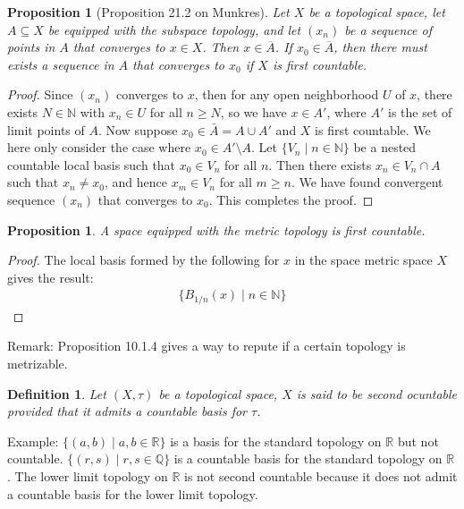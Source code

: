 \documentclass[11pt]{book}
\theoremstyle{break}
\theoremstyle{break}
\newtheorem{prop}[lem]{Proposition}
\newtheorem{defn}{Definition}[corL]
\newcommand{\R}{\mathbb{R}}
\newcommand{\N}{\mathbb{N}}
\newcommand{\Q}{\mathbb{Q}}
\newcommand{\remark}{\color{blue}Remark: \color{black}}
\newcommand{\example}{\color{green}Example: \color{black}}
\begin{document}
\begin{prop}[Proposition 21.2 on Munkres]
Let $X$ be a topological space, let $A \subseteq X$ be equipped with the subspace topology, and let $(x_n)$ be a sequence of points in $A$ that converges to $x \in X$. Then $x \in \overline{A}$. If $x_0 \in \overline{A}$, then there must exists a sequence in $A$ that converges to $x_0$  if $X$ is first countable.
\end{prop}
\begin{proof}
Since $(x_n)$ converges to $x$, then for any open neighborhood $U$ of $x$, there exists $N\in \N$ with $x_n \in U$ for all $n\geq N$, so we have $x \in A'$, where $A'$ is the set of limit points of $A$. Now suppose $x_0 \in \bar{A} = A\cup A'$ and $X$ is first countable. We here only consider the case where $x_0 \in A'\setminus A$. Let $\{V_n\mid n \in \N\}$ be a nested countable local basis such that $x_0\in V_n$ for all $n$. Then there exists $x_n \in V_n \cap A$ such that $x_n \neq x_0$, and hence $x_m \in V_n$ for all $m\geq n$. We have found convergent sequence $(x_n)$ that converges to $x_0$. This completes the proof. 
\end{proof}

\begin{prop}
A space equipped with the metric topology is first countable. 
\end{prop}
\begin{proof}
The local basis formed by the following for $x$ in the space metric space $X$ gives the result:
\begin{align*}
\{B_{1/n}(x) \mid n \in \N\}
\end{align*}
\end{proof}

\remark Proposition 10.1.4 gives a way to repute if a certain topology is metrizable.\\

\begin{defn}
Let $(X,\tau)$ be a topological space, $X$ is said to be second ocuntable provided that it admits a countable basis for $\tau$. 
\end{defn}

\example $\{(a,b) \mid a,b\in \R\}$ is a basis for the standard topology on $\R$ but not countable. $\{(r,s) \mid r,s \in \Q\}$ is a countable basis for the standard topology on $\R$. The lower limit topology on $\R$ is not second countable because it does not admit a countable basis for the lower limit topology.\\
\end{document}
